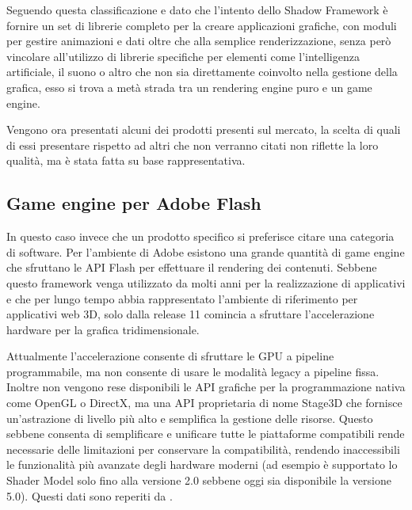 Seguendo questa classificazione e dato che l'intento dello Shadow Framework \`e fornire un set di librerie completo per la creare applicazioni grafiche, con moduli per gestire animazioni e dati oltre che alla semplice renderizzazione, senza per\`o vincolare all'utilizzo di librerie specifiche per elementi come l'intelligenza artificiale, il suono o altro che non sia direttamente coinvolto nella gestione della grafica, esso si trova a met\`a strada tra un rendering engine puro e un game engine.

Vengono ora presentati alcuni dei prodotti presenti sul mercato, la scelta di quali di essi presentare rispetto ad altri che non verranno citati non riflette la loro qualit\`a, ma è stata fatta su base rappresentativa.

\subsection{Game engine per Adobe Flash}
In questo caso invece che un prodotto specifico si preferisce citare una categoria di software. Per l'ambiente di Adobe esistono una grande quantit\`a di game engine che sfruttano le \ac{API} Flash per effettuare il rendering dei contenuti. Sebbene questo framework venga utilizzato da molti anni per la realizzazione di applicativi e che per lungo tempo abbia rappresentato l'ambiente di riferimento per applicativi web 3D, solo dalla release 11 comincia a sfruttare l'accelerazione hardware per la grafica tridimensionale.

Attualmente l'accelerazione consente di sfruttare le GPU a pipeline programmabile, ma non consente di usare le modalit\`a legacy a pipeline fissa. 
Inoltre non vengono rese disponibili le \ac{API} grafiche per la programmazione nativa come OpenGL o DirectX, ma una \ac{API} proprietaria di nome Stage3D che fornisce un'astrazione di livello pi\`u alto e semplifica la gestione delle risorse.
Questo sebbene consenta di semplificare e unificare tutte le piattaforme compatibili rende necessarie delle limitazioni per conservare la compatibilit\`a, rendendo inaccessibili le funzionalit\`a pi\`u avanzate degli hardware moderni (ad esempio \`e supportato lo Shader Model solo fino alla versione 2.0 sebbene oggi sia disponibile la versione 5.0).
Questi dati sono reperiti da \cite{site:adobestage3d}.

